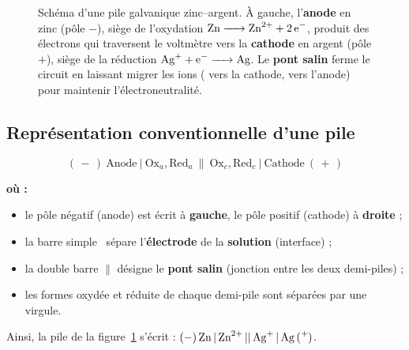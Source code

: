 \documentclass[11pt,a4paper]{article}
\newenvironment{ou}{%
  \par\smallskip\noindent\textbf{où :}\nopagebreak
  \begin{itemize}[leftmargin=1.8em,topsep=2pt,itemsep=1.5pt,parsep=0pt]}%
  {\end{itemize}}
\begin{document}
\begin{figure}[h]
\caption{Schéma d'une pile galvanique zinc--argent. À gauche, l'\textbf{anode} en zinc (pôle $-$),
siège de l'oxydation $\ce{Zn -> Zn^{2+} + 2 e^-}$, produit des électrons qui traversent le
voltmètre vers la \textbf{cathode} en argent (pôle $+$), siège de la réduction
$\ce{Ag+ + e^- -> Ag}$. Le \textbf{pont salin} ferme le circuit en laissant migrer les ions
( vers la cathode,  vers l'anode) pour maintenir l'électroneutralité.}
\label{fig:pile}
\end{figure}

\subsection{Représentation conventionnelle d'une pile}

\begin{formule}
\[
(\,-\,)\ \mathrm{Anode}\ \big|\ \mathrm{Ox}_a,\mathrm{Red}_a\ \big\|\ \mathrm{Ox}_c,\mathrm{Red}_c\ \big|\ \mathrm{Cathode}\ (\,+\,)
\]
\begin{ou}
  \item le pôle négatif (anode) est écrit à \textbf{gauche}, le pôle positif (cathode) à
        \textbf{droite} ;
  \item la barre simple \textbar\ sépare l'\textbf{électrode} de la \textbf{solution} (interface) ;
  \item la double barre $\big\|$ désigne le \textbf{pont salin} (jonction entre les deux
        demi-piles) ;
  \item les formes oxydée et réduite de chaque demi-pile sont séparées par une virgule.
\end{ou}
\end{formule}

Ainsi, la pile de la figure~\ref{fig:pile} s'écrit :
$\ce{(-) Zn | Zn^{2+} || Ag+ | Ag (+)}$.
\end{document}
